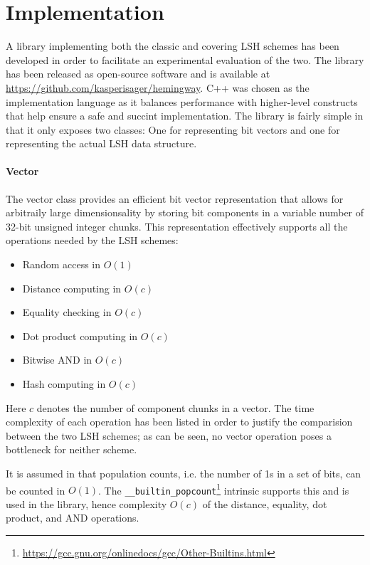 \section{Implementation}
\label{implementation}

A library implementing both the classic and covering LSH schemes has been developed in order to facilitate an experimental evaluation of the two. The library has been released as open-source software and is available at \url{https://github.com/kasperisager/hemingway}. C++ was chosen as the implementation language as it balances performance with higher-level constructs that help ensure a safe and succint implementation. The library is fairly simple in that it only exposes two classes: One for representing bit vectors and one for representing the actual LSH data structure.

\paragraph{Vector} The vector class provides an efficient bit vector representation that allows for arbitraily large dimensionsality by storing bit components in a variable number of 32-bit unsigned integer chunks. This representation effectively supports all the operations needed by the LSH schemes:

\begin{itemize}
  \item Random access in $O(1)$
  \item Distance computing in $O(c)$
  \item Equality checking in $O(c)$
  \item Dot product computing in $O(c)$
  \item Bitwise AND in $O(c)$
  \item Hash computing in $O(c)$
\end{itemize}

Here $c$ denotes the number of component chunks in a vector. The time complexity of each operation has been listed in order to justify the comparision between the two LSH schemes; as can be seen, no vector operation poses a bottleneck for neither scheme.

It is assumed in \cite{DBLP:journals/corr/Pagh15} that population counts, i.e. the number of 1s in a set of bits, can be counted in $O(1)$. The \texttt{\_\_builtin\_popcount}\footnote{\url{https://gcc.gnu.org/onlinedocs/gcc/Other-Builtins.html}} intrinsic supports this and is used in the library, hence complexity $O(c)$ of the distance, equality, dot product, and AND operations.

